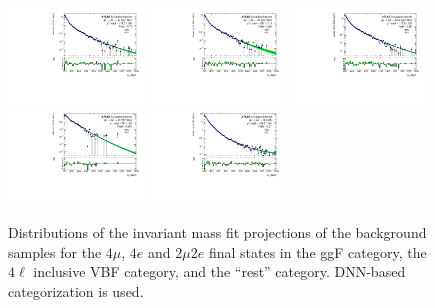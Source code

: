 \begin{figure}[htbp]
    \centering
    \includegraphics[width=0.32\textwidth]{figures/HMHZZ/background/dnn/bkg_shape_ggZZ_ggF_4mu_180_to_2200_log.pdf}
    \includegraphics[width=0.32\textwidth]{figures/HMHZZ/background/dnn/bkg_shape_ggZZ_ggF_4e_185_to_2200_log.pdf}
    \includegraphics[width=0.32\textwidth]{figures/HMHZZ/background/dnn/bkg_shape_ggZZ_ggF_2mu2e_185_to_2200_log.pdf} \\
    \includegraphics[width=0.32\textwidth]{figures/HMHZZ/background/dnn/bkg_shape_ggZZ_VBF_incl_180_to_2200_log.pdf}
    \includegraphics[width=0.32\textwidth]{figures/HMHZZ/background/dnn/bkg_shape_ggZZ_rest_190_to_2200_log.pdf}
    \caption{Distributions of the \mfl invariant mass fit projections of the \ggZZ background samples for the $4\mu$,
    $4e$ and $2\mu 2e$ final states in the ggF category, the $4\ell$ inclusive VBF category, and the ``rest'' category.
    DNN-based categorization is used.} 
    \label{fig:ggZZ_m4l_shape_all_DNN}
\end{figure}


